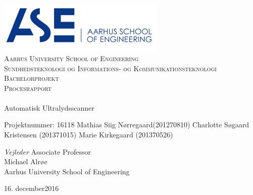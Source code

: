 \begin{titlingpage}
\begin{center}

~ \\[3cm]

\includegraphics[width=0.6\textwidth]{figurer/ASE}~\\[1cm]

\textsc{\LARGE Aarhus University School of Engineering}\\[1.5cm]

\textsc{\Large Sundhedsteknologi og Informations- og Kommunikationsteknologi}\\
\textsc{\Large Bachelorprojekt}\\[0.5cm]
\textsc{\LARGE Procesrapport} \\[1cm]

\noindent\makebox[\linewidth]{\rule{\textwidth}{0.4pt}}\\
[0.5cm]{\Huge Automatisk Ultralydsscanner}
\noindent\makebox[\linewidth]{\rule{\textwidth}{0.4pt}}

\end{center}
Projektnummer: 16118 \newline
Mathias Siig Nørregaard(201270810) \newline
Charlotte Søgaard Kristensen (201371015) \newline		 
Marie Kirkegaard (201370526) \newline 


\textit{Vejleder} \newline
Associate Professor\\
Michael Alrøe\\
Aarhus University School of Engineering


\vfill

\begin{center}
{\large 16. december2016}
\end{center}

\end{titlingpage}